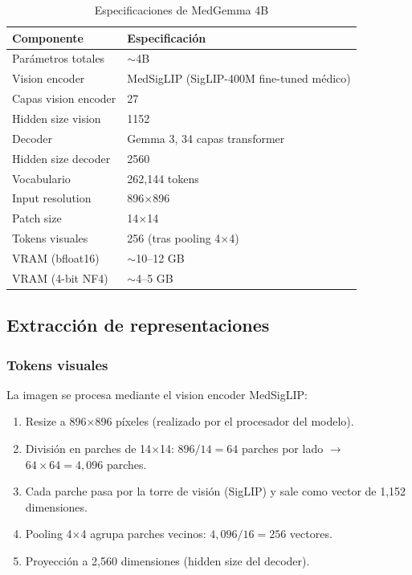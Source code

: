 \documentclass[12pt,a4paper]{article}
\begin{document}
\begin{table}[H]
\centering
\caption{Especificaciones de MedGemma 4B}
\label{tab:medgemma-specs}
\begin{tabular}{ll}
\toprule
\textbf{Componente} & \textbf{Especificación} \\
\midrule
Parámetros totales & $\sim$4B \\
Vision encoder & MedSigLIP (SigLIP-400M fine-tuned médico) \\
Capas vision encoder & 27 \\
Hidden size vision & 1152 \\
Decoder & Gemma 3, 34 capas transformer \\
Hidden size decoder & 2560 \\
Vocabulario & 262,144 tokens \\
Input resolution & 896$\times$896 \\
Patch size & 14$\times$14 \\
Tokens visuales & 256 (tras pooling 4$\times$4) \\
VRAM (bfloat16) & $\sim$10--12 GB \\
VRAM (4-bit NF4) & $\sim$4--5 GB \\
\bottomrule
\end{tabular}
\end{table}

\subsection{Extracción de representaciones}

\subsubsection{Tokens visuales}

La imagen se procesa mediante el vision encoder MedSigLIP:

\begin{enumerate}
    \item Resize a 896$\times$896 píxeles (realizado por el procesador del modelo).
    \item División en parches de 14$\times$14: $896/14 = 64$ parches por lado $\rightarrow$ $64 \times 64 = 4{,}096$ parches.
    \item Cada parche pasa por la torre de visión (SigLIP) y sale como vector de 1,152 dimensiones.
    \item Pooling 4$\times$4 agrupa parches vecinos: $4{,}096 / 16 = 256$ vectores.
    \item Proyección a 2,560 dimensiones (hidden size del decoder).
\end{enumerate}
\end{document}
